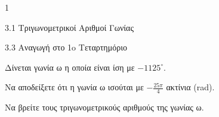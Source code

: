 \begin{ylh}{1}
\item 3.1 Τριγωνομετρικοί Αριθμοί Γωνίας
\item 3.3 Αναγωγή στο 1o Τεταρτημόριο
\end{ylh}
Δίνεται γωνία ω η οποία είναι ίση με $-1125^{\circ}$.
\begin{alist}
\item Να αποδείξετε ότι η γωνία ω ισούται με $-\frac{25\pi}{4}$ ακτίνια (rad).
\item Να βρείτε τους τριγωνομετρικούς αριθμούς της γωνίας ω.
\end{alist}


